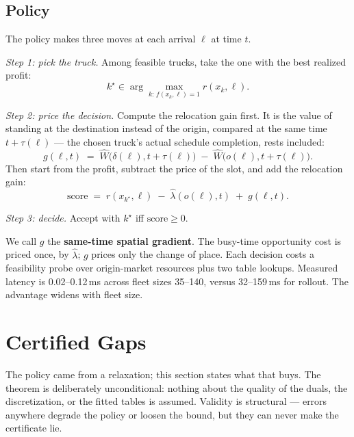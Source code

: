 \documentclass[11pt]{article}
\begin{document}
\subsection{Policy}
\label{sec:policydef}

The policy makes three moves at each arrival $\ell$ at time $t$.

\emph{Step 1: pick the truck.} Among feasible trucks, take the one
with the best realized profit:
\begin{equation}
  k^{\star} \in \arg\max_{k :\, f(x_k, \ell) = 1} r(x_k, \ell).
\end{equation}

\emph{Step 2: price the decision.} Compute the relocation gain first.
It is the value of standing at the destination instead of the origin,
compared at the same time $t + \tau(\ell)$ --- the chosen truck's
actual schedule completion, rests included:
\begin{equation}
  g(\ell, t) \;=\; \widehat{W}\bigl(\delta(\ell), t + \tau(\ell)\bigr)
  \;-\; \widehat{W}\bigl(o(\ell), t + \tau(\ell)\bigr).
  \label{eq:gradient}
\end{equation}
Then start from the profit, subtract the price of the slot, and add the
relocation gain:
\begin{equation}
  \mathrm{score} \;=\; r(x_{k^{\star}}, \ell)
  \;-\; \hat{\lambda}(o(\ell), t) \;+\; g(\ell, t).
  \label{eq:policy}
\end{equation}

\emph{Step 3: decide.} Accept with $k^{\star}$ iff
$\mathrm{score} \geq 0$.

We call $g$ the \textbf{same-time spatial gradient}. The busy-time
opportunity cost is priced once, by $\hat{\lambda}$; $g$ prices only
the change of place. Each decision costs a feasibility probe over
origin-market resources plus two table lookups. Measured latency is
0.02--0.12\,ms across fleet sizes 35--140, versus 32--159\,ms for
rollout. The advantage widens with fleet size.

\section{Certified Gaps}
\label{sec:certs}

The policy came from a relaxation; this section states what that
buys. The theorem is deliberately unconditional: nothing about the
quality of the duals, the discretization, or the fitted tables is
assumed. Validity is structural --- errors anywhere degrade the
policy or loosen the bound, but they can never make the certificate
lie.
\end{document}
